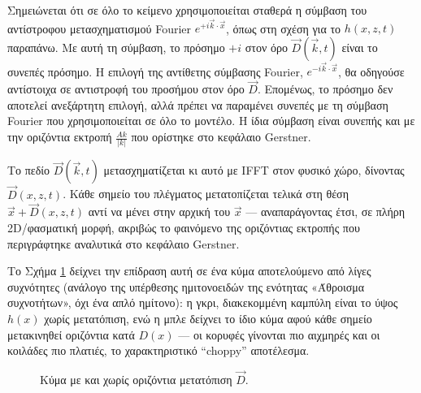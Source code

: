 Σημειώνεται ότι σε όλο το κείμενο χρησιμοποιείται σταθερά η σύμβαση
του αντίστροφου μετασχηματισμού Fourier \(e^{+i\vec{k}\cdot\vec{x}}\),
όπως στη σχέση για το \(h(x,z,t)\) παραπάνω. Με αυτή τη σύμβαση, το
πρόσημο \(+i\) στον όρο \(\vec{D}(\vec{k},t)\) είναι το συνεπές πρόσημο.
Η επιλογή της αντίθετης σύμβασης Fourier, \(e^{-i\vec{k}\cdot\vec{x}}\),
θα οδηγούσε αντίστοιχα σε αντιστροφή του προσήμου στον όρο
\(\vec{D}\). Επομένως, το πρόσημο δεν αποτελεί ανεξάρτητη επιλογή,
αλλά πρέπει να παραμένει συνεπές με τη σύμβαση Fourier που
χρησιμοποιείται σε όλο το μοντέλο. Η ίδια σύμβαση είναι συνεπής και με
την οριζόντια εκτροπή \(\frac{Ak}{|k|}\) που ορίστηκε στο κεφάλαιο
Gerstner.


Το πεδίο \(\vec{D}(\vec{k},t)\) μετασχηματίζεται κι αυτό με IFFT στον φυσικό χώρο, δίνοντας
\(\vec D(x,z,t)\). Κάθε σημείο του πλέγματος μετατοπίζεται τελικά στη
θέση \(\vec{x}+\vec{D}(x,z,t)\) αντί να μένει στην αρχική του
\(\vec{x}\) --- αναπαράγοντας έτσι, σε πλήρη 2D/φασματική μορφή, ακριβώς
το φαινόμενο της οριζόντιας εκτροπής που περιγράφτηκε αναλυτικά στο
κεφάλαιο Gerstner.

Το Σχήμα \ref{fig:choppy_displacement} δείχνει την επίδραση αυτή σε ένα
κύμα αποτελούμενο από λίγες συχνότητες (ανάλογο της υπέρθεσης
ημιτονοειδών της ενότητας «Άθροισμα συχνοτήτων», όχι ένα απλό ημίτονο):
η γκρι, διακεκομμένη καμπύλη είναι το ύψος \(h(x)\) χωρίς μετατόπιση,
ενώ η μπλε δείχνει το ίδιο κύμα αφού κάθε σημείο μετακινηθεί οριζόντια
κατά \(D(x)\) --- οι κορυφές γίνονται πιο αιχμηρές και οι κοιλάδες πιο
πλατιές, το χαρακτηριστικό ``choppy'' αποτέλεσμα.

\begin{figure}[htbp]
\centering
{}
\caption{Κύμα με και χωρίς οριζόντια μετατόπιση $\vec D$.}
\label{fig:choppy_displacement}
\end{figure}

